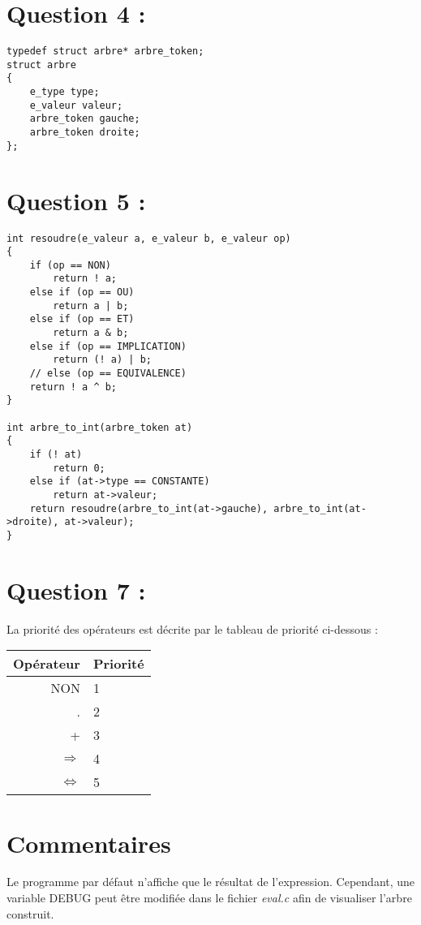\documentclass{article}
\begin{document}
\section*{Question 4 :}
\begin{verbatim}
typedef struct arbre* arbre_token;
struct arbre
{
    e_type type;
    e_valeur valeur;
    arbre_token gauche;
    arbre_token droite;
};
\end{verbatim}

\section*{Question 5 :}
\begin{verbatim}
int resoudre(e_valeur a, e_valeur b, e_valeur op)
{
    if (op == NON)
        return ! a;
    else if (op == OU)
        return a | b;
    else if (op == ET)
        return a & b;
    else if (op == IMPLICATION)
        return (! a) | b;
    // else (op == EQUIVALENCE)
    return ! a ^ b;
}

int arbre_to_int(arbre_token at)
{
    if (! at)
        return 0;
    else if (at->type == CONSTANTE)
        return at->valeur;
    return resoudre(arbre_to_int(at->gauche), arbre_to_int(at->droite), at->valeur);
}
\end{verbatim}
\newpage
\section*{Question 7 :}
La priorité des opérateurs est décrite par le tableau de priorité ci-dessous :
\vspace{5px}

\begin{tabular}[h]{|r|l|}
\hline 
    Opérateur & Priorité\\ 
\hline 
    NON & 1\\
\hline 
    . & 2\\
\hline 
    + & 3\\
\hline 
    $\Rightarrow$ & 4\\
\hline 
    $\Leftrightarrow$ & 5\\
\hline
\end{tabular}
\section*{Commentaires}
Le programme par défaut n'affiche que le résultat de l'expression. Cependant, une variable DEBUG peut être modifiée dans le fichier \textit{eval.c} afin de visualiser l'arbre construit.
\end{document}
